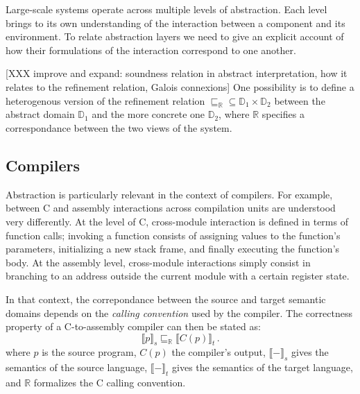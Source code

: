 \documentclass[draft,11pt]{report}
\newcommand{\refby}{\sqsubseteq} %
\begin{document}
Large-scale systems operate across multiple levels of abstraction.
Each level brings to its own understanding of the interaction
between a component and its environment.
To relate abstraction layers we need to give
an explicit account of how their formulations of the interaction
correspond to one another.

[XXX improve and expand:
soundness relation in abstract interpretation,
how it relates to the refinement relation,
Galois connexions]
One possibility is to define a heterogenous version
of the refinement relation
${\refby_\mathbb{R}} \subseteq
 \mathbb{D}_1 \times \mathbb{D}_2$ between
the abstract domain $\mathbb{D}_1$ and
the more concrete one $\mathbb{D}_2$, where
$\mathbb{R}$ specifies a correspondance between
the two views of the system.



\subsection{Compilers} %

Abstraction is particularly relevant
in the context of compilers.
For example, between C and assembly
interactions across compilation units
are understood very differently.
At the level of C,
cross-module interaction is defined in terms of
function calls;
invoking a function consists of assigning values
to the function's parameters,
initializing a new stack frame,
and finally executing the function's body.
At the assembly level, cross-module
interactions simply consist in branching to an address
outside the current module with
a certain register state.

In that context,
the correpondance between the source and target semantic domains
depends on the \emph{calling convention} used by the compiler.
The correctness property of a C-to-assembly compiler
can then be stated as:
\[ \llbracket p \rrbracket_s \sqsubseteq_\mathbb{R}
   \llbracket C(p) \rrbracket_t \,. \]
where
$p$ is the source program, $C(p)$ the compiler's output,
$\llbracket - \rrbracket_s$ gives the semantics of the source language,
$\llbracket - \rrbracket_t$ gives the semantics of the target language,
and $\mathbb{R}$ formalizes the C calling convention.
\end{document}

